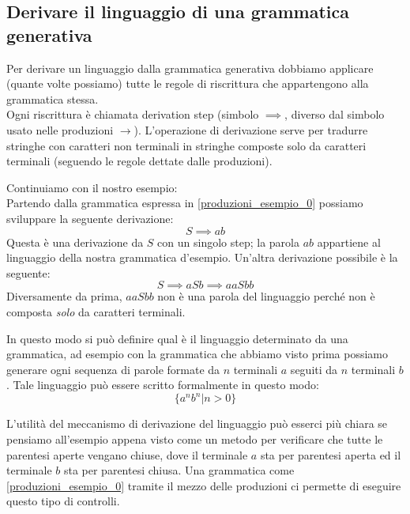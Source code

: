 \documentclass[class=book, crop=false, oneside]{standalone}
\begin{document}
\subsection{Derivare il linguaggio di una grammatica generativa}
Per derivare un linguaggio dalla grammatica generativa dobbiamo applicare (quante volte possiamo) tutte le regole di riscrittura che appartengono alla grammatica stessa.\\
Ogni riscrittura è chiamata derivation step (simbolo $\implies$, diverso dal simbolo usato nelle produzioni $\to$).
L’operazione di derivazione serve per tradurre stringhe con caratteri non terminali in stringhe composte solo da caratteri terminali (seguendo le regole dettate dalle produzioni).


Continuiamo con il nostro esempio:\\
Partendo dalla grammatica espressa in \ref{produzioni_esempio_0} possiamo sviluppare la seguente derivazione:
\begin{equation}
    S \implies ab
\end{equation}
Questa è una derivazione da $S$ con un singolo step; la parola $ab$ appartiene al linguaggio della nostra grammatica d’esempio.
Un'altra derivazione possibile è la seguente:
\begin{equation}
    S \implies aSb \implies aaSbb
\end{equation}
Diversamente da prima, $aaSbb$ non è una parola del linguaggio perché non è composta \emph{solo} da caratteri terminali.

In questo modo si può definire qual è il linguaggio determinato da una grammatica, ad esempio con la grammatica che abbiamo visto prima possiamo generare ogni sequenza di parole formate da $n$ terminali $a$ seguiti da $n$ terminali $b$.
Tale linguaggio può essere scritto formalmente in questo modo:
\begin{equation}
    \{a^n b^n |n>0\}
\end{equation}


L'utilità del meccanismo di derivazione del linguaggio può esserci più chiara se pensiamo all'esempio appena visto come un metodo per verificare che tutte le parentesi aperte vengano chiuse, dove il terminale $a$ sta per parentesi aperta ed il terminale $b$ sta per parentesi chiusa. Una grammatica come \ref{produzioni_esempio_0} tramite il mezzo delle produzioni ci permette di eseguire questo tipo di controlli.
\end{document}
